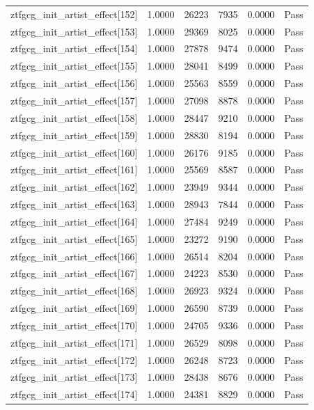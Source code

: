 \begin{table}[htbp]
\begin{tabular}{llrrll}
ztfgcg\_init\_artist\_effect[152] & 1.0000 & 26223 & 7935 & 0.0000 & Pass \\
ztfgcg\_init\_artist\_effect[153] & 1.0000 & 29369 & 8025 & 0.0000 & Pass \\
ztfgcg\_init\_artist\_effect[154] & 1.0000 & 27878 & 9474 & 0.0000 & Pass \\
ztfgcg\_init\_artist\_effect[155] & 1.0000 & 28041 & 8499 & 0.0000 & Pass \\
ztfgcg\_init\_artist\_effect[156] & 1.0000 & 25563 & 8559 & 0.0000 & Pass \\
ztfgcg\_init\_artist\_effect[157] & 1.0000 & 27098 & 8878 & 0.0000 & Pass \\
ztfgcg\_init\_artist\_effect[158] & 1.0000 & 28447 & 9210 & 0.0000 & Pass \\
ztfgcg\_init\_artist\_effect[159] & 1.0000 & 28830 & 8194 & 0.0000 & Pass \\
ztfgcg\_init\_artist\_effect[160] & 1.0000 & 26176 & 9185 & 0.0000 & Pass \\
ztfgcg\_init\_artist\_effect[161] & 1.0000 & 25569 & 8587 & 0.0000 & Pass \\
ztfgcg\_init\_artist\_effect[162] & 1.0000 & 23949 & 9344 & 0.0000 & Pass \\
ztfgcg\_init\_artist\_effect[163] & 1.0000 & 28943 & 7844 & 0.0000 & Pass \\
ztfgcg\_init\_artist\_effect[164] & 1.0000 & 27484 & 9249 & 0.0000 & Pass \\
ztfgcg\_init\_artist\_effect[165] & 1.0000 & 23272 & 9190 & 0.0000 & Pass \\
ztfgcg\_init\_artist\_effect[166] & 1.0000 & 26514 & 8204 & 0.0000 & Pass \\
ztfgcg\_init\_artist\_effect[167] & 1.0000 & 24223 & 8530 & 0.0000 & Pass \\
ztfgcg\_init\_artist\_effect[168] & 1.0000 & 26923 & 9324 & 0.0000 & Pass \\
ztfgcg\_init\_artist\_effect[169] & 1.0000 & 26590 & 8739 & 0.0000 & Pass \\
ztfgcg\_init\_artist\_effect[170] & 1.0000 & 24705 & 9336 & 0.0000 & Pass \\
ztfgcg\_init\_artist\_effect[171] & 1.0000 & 26529 & 8098 & 0.0000 & Pass \\
ztfgcg\_init\_artist\_effect[172] & 1.0000 & 26248 & 8723 & 0.0000 & Pass \\
ztfgcg\_init\_artist\_effect[173] & 1.0000 & 28438 & 8676 & 0.0000 & Pass \\
ztfgcg\_init\_artist\_effect[174] & 1.0000 & 24381 & 8829 & 0.0000 & Pass \\

\end{tabular}
\end{table}
